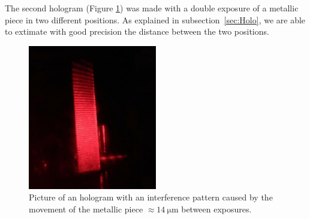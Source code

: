 \documentclass[11pt,a4paper]{article}
\begin{document}
The second hologram (Figure \ref{fig:holographic_interferometry_position}) was made with a double exposure of a metallic piece in two different positions. As explained in subsection~\ref{sec:Holo}, we are able to extimate with good precision the distance between the two positions.

\begin{figure}[ht]
\centering
\includegraphics[width=0.5\textwidth]{Holographic_interferometry_position}
\caption{Picture of an hologram with an interference pattern caused by the movement of the metallic piece $\approx\SI{14}{\micro \m}$ between exposures.}
\label{fig:holographic_interferometry_position}
\end{figure}
\end{document}
